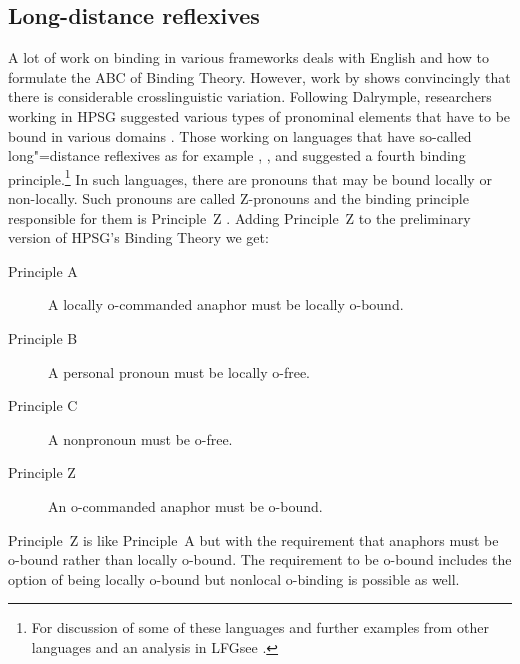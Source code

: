 \documentclass[output=paper
 	        ,biblatex
                ,babelshorthands
                ,newtxmath
                ,draftmode
                ,colorlinks, citecolor=brown
]{langscibook}
\begin{document}
\subsection{Long-distance reflexives}

A lot of work on binding in various frameworks deals with English and how to formulate the ABC of
Binding Theory. However, work by \citet{Dalrymple93a} shows convincingly that there is considerable
crosslinguistic variation. Following Dalrymple, researchers working in HPSG suggested various types of pronominal
elements that have to be bound in various domains \citep{AGS1998a,Koenig1999b,XPS94a-u,PX98a,BM99a,Hellan2005a}.
Those working on languages that have so-called long"=distance
reflexives\label{page-long-distance-reflexives} as for example ,
, and 
\citep*{XPS94a-u,PX98a,BM99a,Hellan2005a} suggested a fourth binding principle.\footnote{
For discussion of some of these languages and further examples from other languages and an analysis
in LFG\indexlfg see .
} In such languages, there are pronouns that  may be bound locally or non-locally.
Such pronouns are called Z-pronouns and the binding principle responsible for them is
Principle~Z \citep[]{BM99a}. Adding Principle~Z to the preliminary version of HPSG's
Binding Theory we get:
\begin{principle-break}
\begin{description}
\item [Principle A] A locally o-commanded anaphor must be locally o-bound.
\item [Principle B] A personal pronoun must be locally o-free.
\item [Principle C] A nonpronoun must be o-free.
\item [Principle Z] An o-commanded anaphor must be o-bound.
\end{description}
\end{principle-break}
Principle~Z is like Principle~A but with the requirement that anaphors must be o-bound rather than
locally o-bound. The requirement to be o-bound includes the option of being locally o-bound but
nonlocal o-binding is possible as well. 
\end{document}
